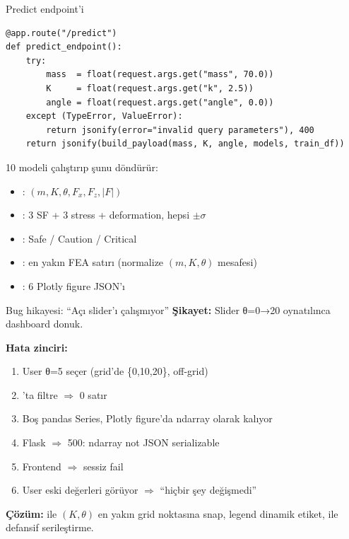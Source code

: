\begin{frame}[fragile]{Predict endpoint'i}
\begin{lstlisting}
@app.route("/predict")
def predict_endpoint():
    try:
        mass  = float(request.args.get("mass", 70.0))
        K     = float(request.args.get("k", 2.5))
        angle = float(request.args.get("angle", 0.0))
    except (TypeError, ValueError):
        return jsonify(error="invalid query parameters"), 400
    return jsonify(build_payload(mass, K, angle, models, train_df))
\end{lstlisting}

  \vspace{0.3cm}
   10 modeli çalıştırıp şunu döndürür:
  \begin{itemize}\small
    \item {}: \((m, K, \theta, F_x, F_z, |F|)\)
    \item {}: 3 SF + 3 stress + deformation, hepsi \(\pm\sigma\)
    \item {}: Safe / Caution / Critical
    \item {}: en yakın FEA satırı (normalize \((m, K, \theta)\) mesafesi)
    \item {}: 6 Plotly figure JSON'ı
  \end{itemize}
\end{frame}

\begin{frame}{Bug hikayesi: ``Açı slider'ı çalışmıyor''}
  \textbf{Şikayet:} Slider θ=0→20 oynatılınca dashboard \alert{donuk}.

  \vspace{0.4cm}
  \textbf{Hata zinciri:}
  \begin{enumerate}\small
    \item User θ=5 seçer (grid'de \{0,10,20\}, off-grid)
    \item {}'ta filtre 
          \(\Rightarrow\) \alert{0 satır}
    \item Boş pandas Series, Plotly figure'da ndarray olarak kalıyor
    \item Flask  \(\Rightarrow\) \alert{500: ndarray not JSON serializable}
    \item Frontend  \(\Rightarrow\) \alert{sessiz fail}
    \item User eski değerleri görüyor \(\Rightarrow\) ``hiçbir şey değişmedi''
  \end{enumerate}

  \vspace{0.3cm}
  \textbf{Çözüm:}  ile \((K, \theta)\) en yakın grid
  noktasına snap, legend dinamik etiket,  ile defansif
  serileştirme.
\end{frame}

